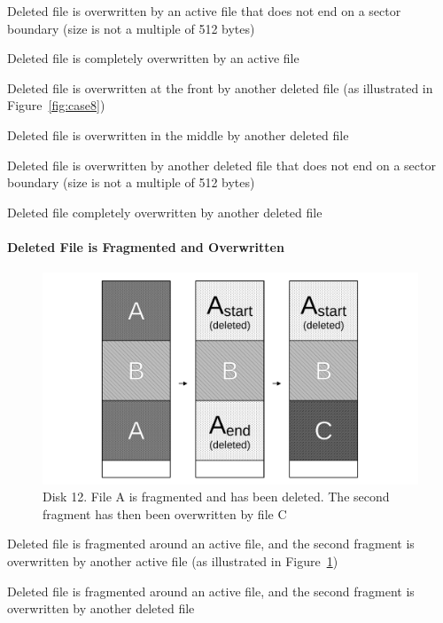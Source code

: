 \begin{arabiclist}
    \item Deleted file is overwritten by an active file that does not end on a sector boundary (size is not a multiple of 512 bytes)
    \item Deleted file is completely overwritten by an active file
    \item Deleted file is overwritten at the front by another deleted file (as illustrated in Figure~\ref{fig:case8})
    \item Deleted file is overwritten in the middle by another deleted file
    \item Deleted file is overwritten by another deleted file that does not end on a sector boundary (size is not a multiple of 512 bytes)
    \item Deleted file completely overwritten by another deleted file
\end{arabiclist}
\paragraph{Deleted File is Fragmented and Overwritten}
 \begin{arabiclist}
 \setcounter{enumi}{11}
     \begin{figure}[h]
        \centering
        \includegraphics[width=\linewidth]{fig/case12.pdf}
        \caption{Disk 12. File A is fragmented and has been deleted. The second fragment has then been overwritten by file C}
        \label{fig:case12}
    \end{figure}
    \item Deleted file is fragmented around an active file, and the second fragment is overwritten by another active file (as illustrated in Figure~\ref{fig:case12})
    \item Deleted file is fragmented around an active file, and the second fragment is overwritten by another deleted file
 \end{arabiclist}

